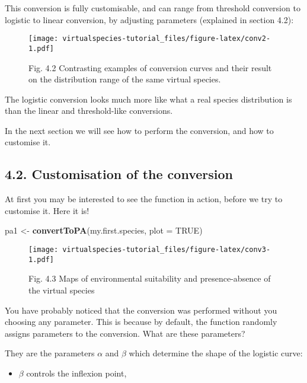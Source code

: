 \documentclass[]{article}
\newenvironment{Shaded}{\begin{snugshade}}{\end{snugshade}}
\newcommand{\KeywordTok}[1]{\textcolor[rgb]{0.13,0.29,0.53}{\textbf{#1}}}
\newcommand{\DataTypeTok}[1]{\textcolor[rgb]{0.13,0.29,0.53}{#1}}
\newcommand{\StringTok}[1]{\textcolor[rgb]{0.31,0.60,0.02}{#1}}
\newcommand{\OtherTok}[1]{\textcolor[rgb]{0.56,0.35,0.01}{#1}}
\newcommand{\NormalTok}[1]{#1}
\providecommand{\tightlist}{%
  \setlength{\itemsep}{0pt}\setlength{\parskip}{0pt}}
\begin{document}
This conversion is fully customisable, and can range from threshold
conversion to logistic to linear conversion, by adjusting parameters
(explained in section 4.2):

\begin{figure}
\centering
\texttt{[image: virtualspecies-tutorial\_files/figure-latex/conv2-1.pdf]}
\caption{Fig. 4.2 Contrasting examples of conversion curves and their
result on the distribution range of the same virtual species.}
\end{figure}

The logistic conversion looks much more like what a real species
distribution is than the linear and threshold-like conversions.

In the next section we will see how to perform the conversion, and how
to customise it.

\subsection{4.2. Customisation of the
conversion}\label{customisation-of-the-conversion}

At first you may be interested to see the function in action, before we
try to customise it. Here it is!

\begin{Shaded}
\begin{Highlighting}[]
\NormalTok{pa1 <-}\StringTok{ }\KeywordTok{convertToPA}\NormalTok{(my.first.species, }\DataTypeTok{plot =} \OtherTok{TRUE}\NormalTok{)}
\end{Highlighting}
\end{Shaded}

\begin{figure}
\centering
\texttt{[image: virtualspecies-tutorial\_files/figure-latex/conv3-1.pdf]}
\caption{Fig. 4.3 Maps of environmental suitability and presence-absence
of the virtual species}
\end{figure}

You have probably noticed that the conversion was performed without you
choosing any parameter. This is because by default, the function
randomly assigns parameters to the conversion. What are these
parameters?

They are the parameters \(\alpha\) and \(\beta\) which determine the
shape of the logistic curve:

\begin{itemize}
\tightlist
\item
  \(\beta\) controls the inflexion point,
\end{itemize}
\end{document}
